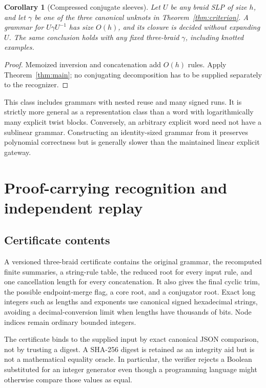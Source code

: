 \documentclass[11pt,letterpaper]{article}
\newtheorem{corollary}[theorem]{Corollary}
\theoremstyle{definition}\newtheorem{definition}[theorem]{Definition}
\theoremstyle{remark}\newtheorem{remark}[theorem]{Remark}
\begin{document}
\begin{corollary}[Compressed conjugate sleeves]\label{cor:sleeves}
Let $U$ be any braid SLP of size $h$, and let $\gamma$ be one of the three canonical unknots in Theorem~\ref{thm:criterion}. A grammar for $U\gamma U^{-1}$ has size $O(h)$, and its closure is decided without expanding $U$. The same conclusion holds with any fixed three-braid $\gamma$, including knotted examples.
\end{corollary}
\begin{proof}
Memoized inversion and concatenation add $O(h)$ rules. Apply Theorem~\ref{thm:main}; no conjugating decomposition has to be supplied separately to the recognizer.
\end{proof}

This class includes grammars with nested reuse and many signed runs. It is strictly more general as a representation class than a word with logarithmically many explicit twist blocks. Conversely, an arbitrary explicit word need not have a sublinear grammar. Constructing an identity-sized grammar from it preserves polynomial correctness but is generally slower than the maintained linear explicit gateway.

\section{Proof-carrying recognition and independent replay}
\subsection{Certificate contents}
A versioned three-braid certificate contains the original grammar, the recomputed finite summaries, a string-rule table, the reduced root for every input rule, and one cancellation length for every concatenation. It also gives the final cyclic trim, the possible endpoint-merge flag, a core root, and a conjugator root. Exact long integers such as lengths and exponents use canonical signed hexadecimal strings, avoiding a decimal-conversion limit when lengths have thousands of bits. Node indices remain ordinary bounded integers.

The certificate binds to the supplied input by exact canonical JSON comparison, not by trusting a digest. A SHA-256 digest is retained as an integrity aid but is not a mathematical equality oracle. In particular, the verifier rejects a Boolean substituted for an integer generator even though a programming language might otherwise compare those values as equal.
\end{document}

